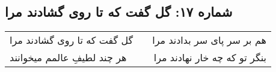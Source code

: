 \begin{center}
\section*{شماره ۱۷: گل گفت که تا روی گشادند مرا}
\label{sec:017}
\begin{longtable}{l p{0.5cm} r}
گل گفت که تا روی گشادند مرا
&&
هم بر سر پای سر بدادند مرا
\\
هر چند لطیفِ عالمم میخوانند
&&
بنگر تو که چه خار نهادند مرا
\\
\end{longtable}
\end{center}
